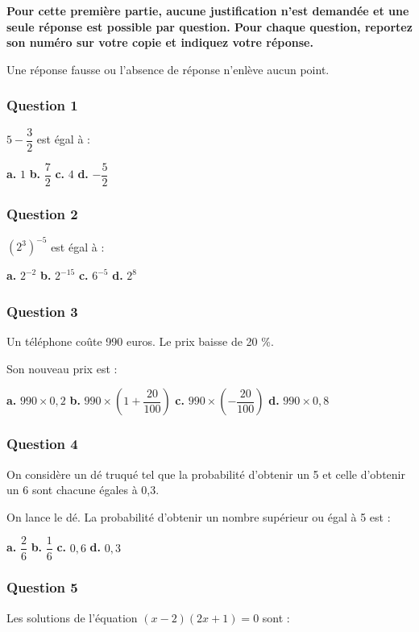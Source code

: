 \textbf{Pour cette première partie, aucune justification n'est demandée et une seule réponse est possible par question. Pour chaque question, reportez son numéro sur votre copie et indiquez votre réponse.}

Une réponse fausse ou l'absence de réponse n'enlève aucun point.

\subsubsection*{Question 1}
$5-\dfrac{3}{2}$ est égal à :

\textbf{a.} $1$ \hfill \textbf{b.} $\dfrac{7}{2}$ \hfill \textbf{c.} $4$ \hfill \textbf{d.} $-\dfrac{5}{2}$

\subsubsection*{Question 2}
$\left(2^3\right)^{-5}$ est égal à :

\textbf{a.} $2^{-2}$ \hfill \textbf{b.} $2^{-15}$ \hfill \textbf{c.} $6^{-5}$ \hfill \textbf{d.} $2^8$

\subsubsection*{Question 3}
Un téléphone coûte 990 euros. Le prix baisse de 20 \%.

Son nouveau prix est :

\textbf{a.} $990\times 0{,}2$ \hfill \textbf{b.} $990\times\left(1+\dfrac{20}{100}\right)$ \hfill \textbf{c.} $990\times\left(-\dfrac{20}{100}\right)$ \hfill \textbf{d.} $990\times 0{,}8$

\subsubsection*{Question 4}
On considère un dé truqué tel que la probabilité d'obtenir un 5 et celle d'obtenir un 6 sont chacune égales à 0,3.

On lance le dé. La probabilité d'obtenir un nombre supérieur ou égal à 5 est :

\textbf{a.} $\dfrac{2}{6}$ \hfill \textbf{b.} $\dfrac{1}{6}$ \hfill \textbf{c.} $0{,}6$ \hfill \textbf{d.} $0{,}3$

\subsubsection*{Question 5}
Les solutions de l'équation $(x-2)(2x+1)=0$ sont :

